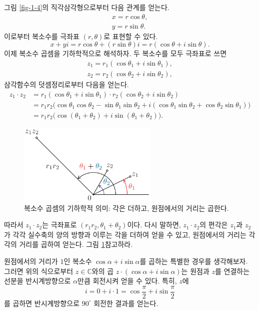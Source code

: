 그림 \ref{fig-1-4}의 직각삼각형으로부터 다음 관계를 얻는다.
\begin{gather*}
x = r \cos\theta, \\
y = r \sin \theta.
\end{gather*}
이로부터 복소수를 극좌표 $(r,\theta)$로 표현할 수 있다.
$$
x + yi = r\cos\theta +(r\sin \theta)i
= r(\cos\theta + i\sin \theta).
$$
이제 복소수 곱셈을 기하학적으로 해석하자.
두 복소수를 모두 극좌표로 쓰면
\begin{gather*}
z_1 = r_1 (\cos\theta_1 + i\sin\theta_1), \\
z_2 = r_2 (\cos\theta_2 + i\sin\theta_2),
\end{gather*}
삼각함수의 덧셈정리로부터 다음을 얻는다.
\begin{align*}
z_1\cdot z_2 &= r_1(\cos\theta_1+i\sin\theta_1) \cdot r_2(\cos\theta_2+i\sin\theta_2) \\
&= r_1r_2 \big(\cos\theta_1\cos\theta_2 - \sin\theta_1\sin\theta_2 +
i(\cos\theta_1\sin\theta_2 + \cos\theta_2\sin\theta_1)\big) \\
&= r_1r_2\big(\cos(\theta_1 +\theta_2) + i \sin(\theta_1 +\theta_2)\big).
\end{align*}

\begin{figure}[!h]
\begin{center}
\includegraphics[width=0.6\textwidth]{./SaltChapter/figs/fig-1-5}
\end{center}
\caption{복소수 곱셈의 기하학적 의미: 각은 더하고, 원점에서의 거리는 곱한다.}
\label{fig-1-5}
\end{figure}

따라서 $z_1\cdot z_2$는 극좌표로 $(r_1r_2, \theta_1+\theta_2)$이다.
다시 말하면, 
$z_1\cdot z_2$의 편각은
$z_1$과 $z_2$가 각각 실수축의 양의 방향과 이루는 각을 더하여 얻을 수 있고,
원점에서의 거리는 각각의 거리를 곱하여 얻는다.
그림 \ref{fig-1-5}\를 참고하라.



원점에서의 거리가 $1$인 복소수
$\cos\alpha + i \sin\alpha$를 곱하는 특별한 경우를 생각해보자.
그러면 위의 식으로부터 $z\in\mathbb C$와의 곱
$z\cdot(\cos\alpha + i\sin\alpha)$는 
원점과 $z$를 연결하는 선분을 반시계방향으로 $\alpha$만큼 회전시켜 얻을 수 있다.
특히, $z$에 
$$
i = 0 + i\cdot 1 = \cos\frac\pi2 + i \sin\frac\pi2
$$
를 곱하면 반시계방향으로 $90^{\circ}$ 회전한 결과를 얻는다.

